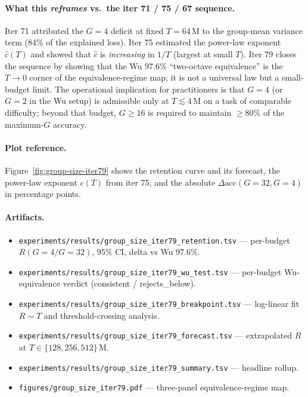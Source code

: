 \paragraph{What this \emph{reframes} vs.\ the iter 71 / 75 / 67
sequence.}
Iter 71 attributed the $G{=}4$ deficit at fixed $T{=}64\,\mathrm{M}$
to the group-mean variance term (84\% of the explained loss).
Iter 75 estimated the power-law exponent $\hat c(T)$ and showed
that $\hat c$ is \emph{increasing} in $1/T$ (largest at small $T$).
Iter 79 closes the sequence by showing that the Wu 97.6\%
``two-octave equivalence'' is the $T{\to}0$ corner of the
equivalence-regime map; it is not a universal law but a small-budget
limit.  The operational implication for practitioners is that
$G{=}4$ (or $G{=}2$ in the Wu setup) is admissible only at
$T \lesssim 4\,\mathrm{M}$ on a task of comparable difficulty;
beyond that budget, $G \ge 16$ is required to maintain $\ge 80\%$
of the maximum-$G$ accuracy.

\paragraph{Plot reference.}
Figure~\ref{fig:group-size-iter79} shows the retention curve and
its forecast, the power-law exponent $c(T)$ from iter 75, and the
absolute $\Delta\mathrm{acc}(G{=}32, G{=}4)$ in percentage points.

\paragraph{Artifacts.}
\begin{itemize}
  \item \texttt{experiments/results/group\_size\_iter79\_retention.tsv} ---
        per-budget $R(G{=}4/G{=}32)$, 95\% CI, delta vs Wu 97.6\%.
  \item \texttt{experiments/results/group\_size\_iter79\_wu\_test.tsv} ---
        per-budget Wu-equivalence verdict (consistent / rejects\_below).
  \item \texttt{experiments/results/group\_size\_iter79\_breakpoint.tsv} ---
        log-linear fit $R \sim T$ and threshold-crossing analysis.
  \item \texttt{experiments/results/group\_size\_iter79\_forecast.tsv} ---
        extrapolated $R$ at $T \in \{128, 256, 512\}\,\mathrm{M}$.
  \item \texttt{experiments/results/group\_size\_iter79\_summary.tsv} ---
        headline rollup.
  \item \texttt{figures/group\_size\_iter79.pdf} ---
        three-panel equivalence-regime map.
\end{itemize}

